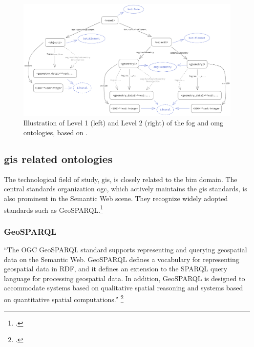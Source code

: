 \begin{figure}[H]
    \begin{adjustwidth}{-0.8cm}{-0.8cm}
        \centering
        \ttfamily
        \includegraphics[width=1.1\textwidth]{figures/pdf/fog-omg.pdf}
        \caption[Illustration of the \acs{fog} and \acs{omg} ontologies]{Illustration of Level 1 (left) and Level 2 (right) of the \acs{fog} and \acs{omg} ontologies, based on \cite{Bonduel2019}.}
        \label{fig:fogGom}
    \end{adjustwidth}
\end{figure}

\subsection{\acs{gis} related ontologies}
The technological field of study, \acf{gis}, is closely related to the \ac{bim} domain. The central standards organization \ac{ogc}, which actively maintains the \ac{gis} standards, is also prominent in the Semantic Web scene. They recognize widely adopted standards such as GeoSPARQL.\footcite{OGC2023SW}

\subsubsection{GeoSPARQL}
\enquote{The OGC GeoSPARQL standard supports representing and querying geospatial data on the Semantic Web. GeoSPARQL defines a vocabulary for representing geospatial data in RDF, and it defines an extension to the SPARQL query language for processing geospatial data. In addition, GeoSPARQL is designed to accommodate systems based on qualitative spatial reasoning and systems based on quantitative spatial computations.} \footcite{OGC2023}

